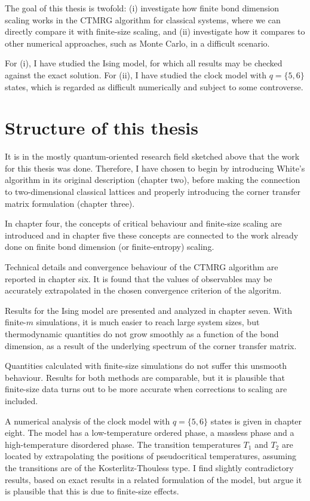 The goal of this thesis is twofold: (i) investigate how finite bond
dimension scaling works in the CTMRG algorithm for classical systems,
where we can directly compare it with finite-size scaling, and (ii)
investigate how it compares to other numerical approaches, such as
Monte Carlo, in a difficult scenario.

For (i), I have studied the Ising model, for which all results may be checked
against the exact solution. For (ii), I have studied the clock model with $q
= \{5,
6 \}$ states, which is regarded as difficult numerically and subject to some
controverse.

\section{Structure of this thesis}

It is in the mostly quantum-oriented research field sketched above that the
work for this thesis was done. Therefore, I have chosen to
begin by introducing White's algorithm in its original description
(chapter two), before making the connection to two-dimensional classical
lattices and properly introducing the corner transfer matrix formulation
(chapter three).

In chapter four, the concepts of critical behaviour and finite-size
scaling are introduced and in chapter five these concepts are connected to
the work already done on finite bond dimension (or finite-entropy)
scaling.

Technical details and convergence behaviour of the CTMRG algorithm are reported in chapter six.
It is found that the values of observables may be accurately extrapolated in the chosen convergence criterion of the
algoritm.

Results for the Ising model are presented and analyzed in chapter seven.
With finite-$m$ simulations, it is much easier to reach large system sizes,
but thermodynamic quantities do not grow smoothly as a function of the bond dimension,
as a result of the underlying spectrum of the corner transfer matrix.

Quantities calculated with finite-size simulations do not suffer this unsmooth behaviour.
Results for both methods are comparable, but it is plausible that finite-size data turns out to be more accurate when
corrections to scaling are included.

A numerical analysis of the clock model with $q = \{5, 6\}$ states is given in chapter eight.
The model has a low-temperature ordered phase, a massless phase and a high-temperature disordered phase.
The transition temperatures $T_1$ and $T_2$ are located by extrapolating the positions of pseudocritical temperatures,
assuming the transitions are of the Kosterlitz-Thouless type.
I find slightly contradictory results, based on exact results in a related formulation of the model,
but argue it is plausible that this is due to finite-size effects.
